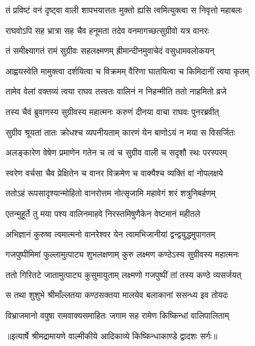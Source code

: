 \twolineshloka
{तं प्रविष्टं वनं दृष्ट्वा वाली शापभयात्ततः}
{मुक्तो ह्यसि त्वमित्युक्त्वा स निवृत्तो महाबलः} %

\twolineshloka
{राघवोऽपि सह भ्रात्रा सह चैव हनूमता}
{तदेव वनमागच्छत्सुग्रीवो यत्र वानरः} %

\twolineshloka
{तं समीक्ष्यागतं रामं सुग्रीवः सहलक्ष्मणम्}
{ह्रीमान्दीनमुवाचेदं वसुधामवलोकयन्} %

\twolineshloka
{आह्वयस्वेति मामुक्त्वा दर्शयित्वा च विक्रमम्}
{वैरिणा घातयित्वा च किमिदानीं त्वया कृतम्} %

\twolineshloka
{तामेव वेलां वक्तव्यं त्वया राघव तत्त्वतः}
{वालिनं न निहन्मीति ततो नाहमितो व्रजे} %

\twolineshloka
{तस्य चैवं ब्रुवाणस्य सुग्रीवस्य महात्मनः}
{करुणं दीनया वाचा राघवः पुनरब्रवीत्} %

\twolineshloka
{सुग्रीव श्रूयतां तातः क्रोधश्च व्यपनीयताम्}
{कारणं येन बाणोऽयं न मया स विसर्जितः} %

\twolineshloka
{अलङ्कारेण वेषेण प्रमाणेन गतेन च}
{त्वं च सुग्रीव वाली च सदृशौ स्थः परस्परम्} %

\twolineshloka
{स्वरेण वर्चसा चैव प्रेक्षितेन च वानर}
{विक्रमेण च वाक्यैश्च व्यक्तिं वां नोपलक्षये} %

\twolineshloka
{ततोऽहं रूपसादृश्यान्मोहितो वानरोत्तम}
{नोत्सृजामि महावेगं शरं शत्रुनिबर्हणम्} %

\twolineshloka
{एतन्मुहूर्ते तु मया पश्य वालिनमाहवे}
{निरस्तमिषुणैकेन वेष्टमानं महीतले} %

\twolineshloka
{अभिज्ञानं कुरुष्व त्वमात्मनो वानरेश्वर}
{येन त्वामभिजानीयां द्वन्द्वयुद्धमुपागतम्} %

\twolineshloka
{गजपुष्पीमिमां फुल्लामुत्पाट्य शुभलक्षणाम्}
{कुरु लक्ष्मण कण्ठेऽस्य सुग्रीवस्य महात्मनः} %

\twolineshloka
{ततो गिरितटे जातामुत्पाट्य कुसुमायुताम्}
{लक्ष्मणो गजपुष्पीं तां तस्य कण्ठे व्यसर्जयत्} %

\twolineshloka
{स तथा शुशुभे श्रीमाँल्लतया कण्ठसक्तया}
{मालयेव बलाकानां ससन्ध्य इव तोयदः} %

\twolineshloka
{विभ्राजमानो वपुषा रामवाक्यसमाहितः}
{जगाम सह रामेण किष्किन्धां वालिपालिताम्} %


{॥इत्यार्षे श्रीमद्रामायणे वाल्मीकीये आदिकाव्ये किष्किन्धाकाण्डे द्वादशः सर्गः॥}


